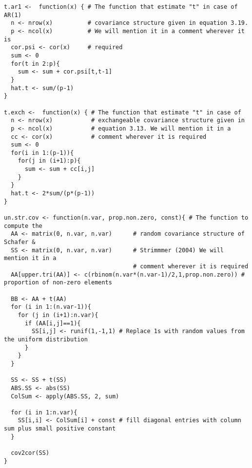 \begin{lstlisting}
t.ar1 <-  function(x) { # The function that estimate "t" in case of AR(1)
  n <- nrow(x)          # covariance structure given in equation 3.19. 
  p <- ncol(x)          # We will mention it in a comment wherever it is
  cor.psi <- cor(x)     # required
  sum <- 0
  for(t in 2:p){
    sum <- sum + cor.psi[t,t-1]
  }
  hat.t <- sum/(p-1)
}

t.exch <-  function(x) { # The function that estimate "t" in case of
  n <- nrow(x)           # exchangeable covariance structure given in
  p <- ncol(x)           # equation 3.13. We will mention it in a 
  cc <- cor(x)           # comment wherever it is required
  sum <- 0
  for(i in 1:(p-1)){
    for(j in (i+1):p){
      sum <- sum + cc[i,j]
    }
  }
  hat.t <- 2*sum/(p*(p-1))
}

un.str.cov <- function(n.var, prop.non.zero, const){ # The function to compute the
  AA <- matrix(0, n.var, n.var)      # random covariance structure of Schafer &         
  SS <- matrix(0, n.var, n.var)      # Strimmmer (2004) We will mention it in a
                                     # comment wherever it is required  
  AA[upper.tri(AA)] <- c(rbinom(n.var*(n.var-1)/2,1,prop.non.zero)) # proportion of non-zero elements
  
  BB <- AA + t(AA)
  for (i in 1:(n.var-1)){
    for (j in (i+1):n.var){
      if (AA[i,j]==1){
        SS[i,j] <- runif(1,-1,1) # Replace 1s with random values from the uniform distribution
      }
    }
  }
  
  SS <- SS + t(SS)
  ABS.SS <- abs(SS)
  ColSum <- apply(ABS.SS, 2, sum)
  
  for (i in 1:n.var){
    SS[i,i] <- ColSum[i] + const # fill diagonal entries with column sum plus small positive constant
  }
  
  cov2cor(SS)
}
\end{lstlisting}

